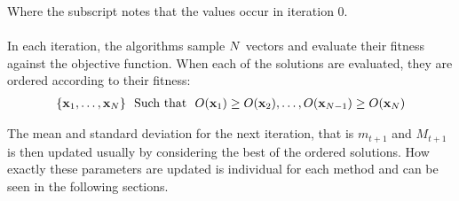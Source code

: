 Where the subscript notes that the values occur in iteration 0.\\
\\
In each iteration, the algorithms sample $N$ vectors and evaluate their fitness
against the objective function. When each of the solutions are evaluated,
they are ordered according to their fitness:
\begin{align*}
\{\textbf{\individual }_{1}, \hdots, 
\textbf{\individual }_{\populationSize }\}\ \ \text{Such that}\ \ 
\fitnessFunction(\textbf{x}_1) \geq 
\fitnessFunction(\textbf{\individual }_2), \hdots, 
\fitnessFunction(\textbf{\individual }_{\populationSize  - 1}) \geq 
\fitnessFunction(\textbf{\individual }_{\populationSize })
\end{align*}

The mean and standard deviation for the next iteration, that is $m_{t+1}$ and $M_{t+1}$
is then updated usually by considering the best of the ordered solutions. How exactly
these parameters are updated is individual for each method and can be seen in the following
sections.


